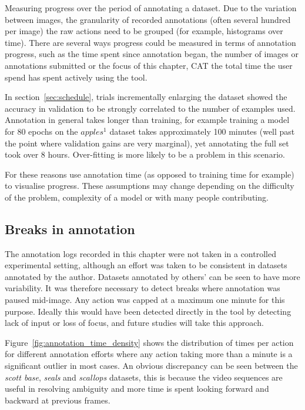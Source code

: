Measuring progress over the period of annotating a dataset. Due to the variation between images, the granularity of recorded annotations (often several hundred per image) the raw actions need to be grouped (for example, histograms over time). There are several ways progress could be measured in terms of annotation progress, such as the time spent since annotation began, the number of images or annotations submitted or the focus of this chapter, \gls{CAT} the total time the user spend has spent actively using the tool.

In section~\ref{sec:schedule}, trials incrementally enlarging the dataset showed the accuracy in validation to be strongly correlated to the number of examples used. Annotation in general takes longer than training, for example training a model for 80 epochs on the $apples^1$ dataset takes approximately 100 minutes (well past the point where validation gains are very marginal), yet annotating the full set took over 8 hours. Over-fitting is more likely to be a problem in this scenario. 

For these reasons use annotation time (as opposed to training time for example) to visualise progress. These assumptions  may change depending on the difficulty of the problem, complexity of a model or with many people contributing.

\subsection {Breaks in annotation}
\label{sec:break_detection}

The annotation logs recorded in this chapter were not taken in a controlled experimental setting, although an effort was taken to be consistent in datasets annotated by the author. Datasets annotated by others' can be seen to have more variability. It was therefore necessary to detect breaks where annotation was paused mid-image. Any action was capped at a maximum one minute for this purpose. Ideally this would have been detected directly in the tool by detecting lack of input or loss of focus, and future studies will take this approach. 

Figure~\ref{fig:annotation_time_density} shows the distribution of times per action for different annotation efforts where any action taking more than a minute is a significant outlier in most cases. An obvious discrepancy can be seen between the \emph{scott base}, \emph{seals} and \emph{scallops} datasets, this is because the video sequences are useful in resolving ambiguity and more time is spent looking forward and backward at previous frames.

